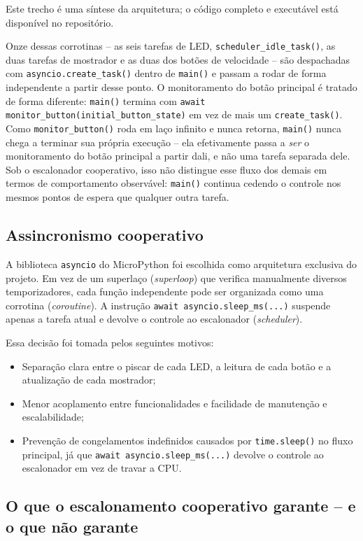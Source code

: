 \documentclass[12pt,a4paper]{article}
\begin{document}
Este trecho é uma síntese da arquitetura; o código completo e executável está disponível no repositório.

Onze dessas corrotinas -- as seis tarefas de LED, \texttt{scheduler\_idle\_task()}, as duas tarefas de mostrador e as duas dos botões de velocidade -- são despachadas com \texttt{asyncio.create\_task()} dentro de \texttt{main()} e passam a rodar de forma independente a partir desse ponto. O monitoramento do botão principal é tratado de forma diferente: \texttt{main()} termina com \texttt{await monitor\_button(initial\_button\_state)} em vez de mais um \texttt{create\_task()}. Como \texttt{monitor\_button()} roda em laço infinito e nunca retorna, \texttt{main()} nunca chega a terminar sua própria execução -- ela efetivamente passa a \emph{ser} o monitoramento do botão principal a partir dali, e não uma tarefa separada dele. Sob o escalonador cooperativo, isso não distingue esse fluxo dos demais em termos de comportamento observável: \texttt{main()} continua cedendo o controle nos mesmos pontos de espera que qualquer outra tarefa.

\subsection{Assincronismo cooperativo}

A biblioteca \texttt{asyncio} do MicroPython foi escolhida como arquitetura exclusiva do projeto. Em vez de um superlaço (\textit{superloop}) que verifica manualmente diversos temporizadores, cada função independente pode ser organizada como uma corrotina (\textit{coroutine}). A instrução \texttt{await asyncio.sleep\_ms(...)} suspende apenas a tarefa atual e devolve o controle ao escalonador (\textit{scheduler}).

Essa decisão foi tomada pelos seguintes motivos:

\begin{itemize}
  \item Separação clara entre o piscar de cada LED, a leitura de cada botão e a atualização de cada mostrador;
  \item Menor acoplamento entre funcionalidades e facilidade de manutenção e escalabilidade;
  \item Prevenção de congelamentos indefinidos causados por \texttt{time.sleep()} no fluxo principal, já que \texttt{await asyncio.sleep\_ms(...)} devolve o controle ao escalonador em vez de travar a CPU.
\end{itemize}

\subsection{O que o escalonamento cooperativo garante -- e o que não garante}
\label{sec:limites-cooperativos}
\end{document}
